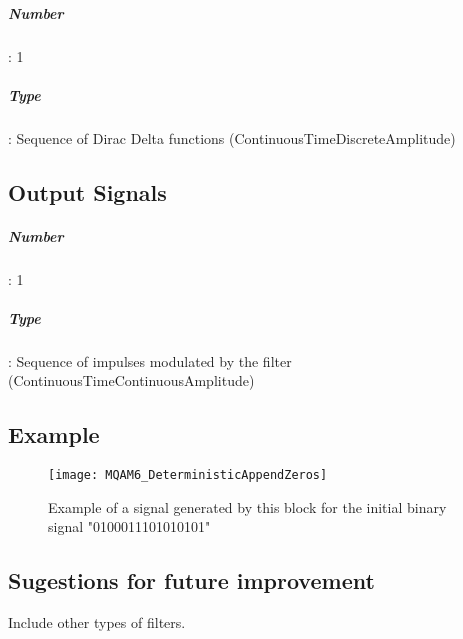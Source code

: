 \documentclass[a4paper]{article}
\begin{document}
\subparagraph*{Number}: 1

\subparagraph*{Type}: Sequence of Dirac Delta functions (ContinuousTimeDiscreteAmplitude)

\subsection*{Output Signals}

\subparagraph*{Number}: 1

\subparagraph*{Type}: Sequence of impulses modulated by the filter (ContinuousTimeContinuousAmplitude)

\subsection*{Example}

\begin{figure}[h]
	\centering
	\texttt{[image: MQAM6\_DeterministicAppendZeros]}
	\label{MQAM6_DeterministicAppendZeros}\caption{Example of a signal generated by this block for the initial binary signal "0100011101010101"}
\end{figure}

\subsection*{Sugestions for future improvement}

Include other types of filters.
\end{document}

